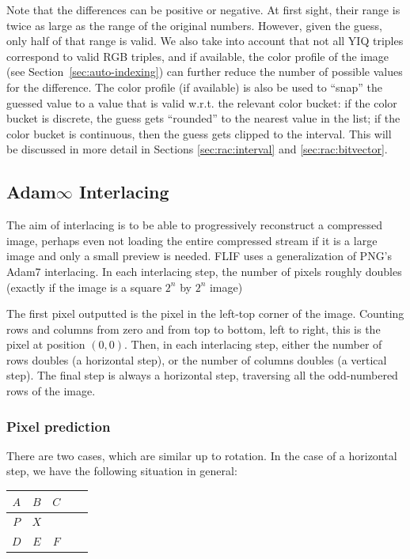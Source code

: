 \documentclass[a4paper,USenglish]{lipics}
\begin{document}
Note that the differences can be positive or negative. At first sight, their range
is twice as large as the range of the original numbers. However, given the guess, only
half of that range is valid. We also take into account that not all YIQ triples correspond
to valid RGB triples, and if available, the color profile of the image (see Section~\ref{sec:auto-indexing})
can further reduce the number of possible values for the difference. The color profile (if available)
is also be used to ``snap'' the guessed value to a value that is valid w.r.t. the relevant color bucket:
if the color bucket is discrete, the guess gets ``rounded'' to the nearest value in the list;
if the color bucket is continuous, then the guess gets clipped to the interval.
This will be discussed in more detail in
Sections \ref{sec:rac:interval} and \ref{sec:rac:bitvector}.



\subsection{Adam$\infty$ Interlacing}
\label{sec:interlacing}

The aim of interlacing is to be able to progressively reconstruct a compressed image, perhaps even
not loading the entire compressed stream if it is a large image and only a small preview is needed.
FLIF uses a generalization of PNG's Adam7 interlacing. In each interlacing step, the number of pixels
roughly doubles (exactly if the image is a square $2^n$ by $2^n$ image) 

The first pixel outputted is the pixel in the left-top corner of the image. Counting rows and columns from zero
and from top to bottom, left to right, this is the pixel at position $(0,0)$.
Then, in each interlacing step, either the number of rows doubles (a horizontal step),
or the number of columns doubles (a vertical step). The final step is always a horizontal step, traversing all the
odd-numbered rows of the image.

\subsubsection{Pixel prediction}
\label{sec:prediction_interlacing}

There are two cases, which are similar up to rotation.
In the case of a horizontal step, we have the following situation in general:

\begin{center}
\begin{tabular}{|c|c|c|c|c|}
\hline
$A$ & $B$ & $C$ \\
\hline
$P$ & $X$ &  \\
\hline
$D$ & $E$ & $F$ \\
\hline
\end{tabular}
\end{center}
\end{document}

